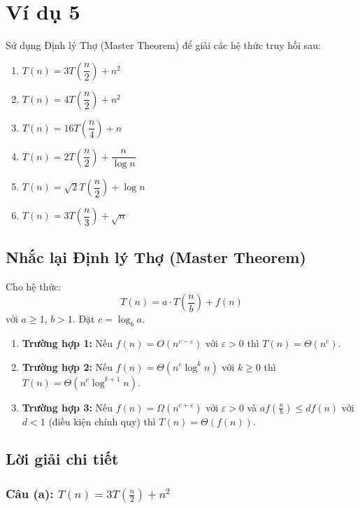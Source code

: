 \documentclass{article}
\begin{document}
\section{Ví dụ 5}

Sử dụng Định lý Thợ (Master Theorem) để giải các hệ thức truy hồi sau:

\begin{enumerate}
    \item[(a)] \( T(n) = 3T\left(\dfrac{n}{2}\right) + n^2 \)
    \item[(b)] \( T(n) = 4T\left(\dfrac{n}{2}\right) + n^2 \)
    \item[(c)] \( T(n) = 16T\left(\dfrac{n}{4}\right) + n \)
    \item[(d)] \( T(n) = 2T\left(\dfrac{n}{2}\right) + \dfrac{n}{\log n} \)
    \item[(e)] \( T(n) = \sqrt{2}T\left(\dfrac{n}{2}\right) + \log n \)
    \item[(f)] \( T(n) = 3T\left(\dfrac{n}{3}\right) + \sqrt{n} \)
\end{enumerate}

\subsection{Nhắc lại Định lý Thợ (Master Theorem)}

Cho hệ thức:
\[
T(n) = a \cdot T\left(\frac{n}{b}\right) + f(n)
\]
với \(a \ge 1\), \(b > 1\). Đặt \(c = \log_b a\).

\begin{enumerate}
    \item \textbf{Trường hợp 1:} Nếu \(f(n) = O(n^{c - \varepsilon})\) với \(\varepsilon > 0\) thì \(T(n) = \Theta(n^c)\).
    \item \textbf{Trường hợp 2:} Nếu \(f(n) = \Theta(n^c \log^k n)\) với \(k \ge 0\) thì \(T(n) = \Theta(n^c \log^{k+1} n)\).
    \item \textbf{Trường hợp 3:} Nếu \(f(n) = \Omega(n^{c + \varepsilon})\) với \(\varepsilon > 0\) và \(a f\left(\frac{n}{b}\right) \le d f(n)\) với \(d < 1\) (điều kiện chính quy) thì \(T(n) = \Theta(f(n))\).
\end{enumerate}

\subsection{Lời giải chi tiết}

\subsubsection{Câu (a): \( T(n) = 3T\left(\frac{n}{2}\right) + n^2 \)}
\end{document}
